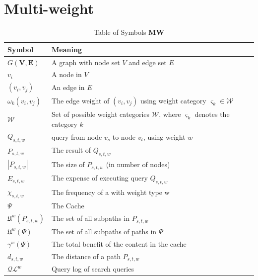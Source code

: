 \section{Multi-weight} \label{sec:intro}


\begin{table}
\begin{tabular*}{\columnwidth}{|l|p{}|}
\hline
\bf Symbol		& \bf Meaning \\\hline
$G\mathbf{(V,E)}$ 	& A graph with node set $V$ and edge set $E$ \\\hline 
$v_i$			& A node in $V$ \\\hline 
$(v_i,v_j)$		& An edge in $E$ \\\hline 
$\omega_k(v_i,v_j)$	& The edge weight of $(v_i,v_j)$ using weight category $\varsigma_k \in \mathcal{W}$ \\\hline
$\mathcal{W}$		& Set of possible weight categories $\mathcal{W}$, where $\varsigma_k$ denotes the category $k$ \\\hline

$Q_{s,t,w}$		& \spath query from node $v_s$ to node $v_t$, using weight $w$\\\hline
$P_{s,t,w}$		& The \spath result of $Q_{s,t,w}$ \\\hline
$|P_{s,t,w}|$		& The size of $P_{s,t,w}$ (in number of nodes) \\\hline
$E_{s,t,w}$		& The expense of executing query $Q_{s,t,w}$ \\\hline
$\chi_{s,t,w}$		& The frequency of a \spath with weight type w \\\hline
$\Psi$ 			& The Cache \\\hline
$\mathfrak{U}^w(P_{s,t,w})$& The set of all subpaths in $P_{s,t,w}$ \\\hline
$\mathfrak{U}^w(\Psi)$	& The set of all subpaths of paths in $\Psi$ \\\hline
$\gamma^w(\Psi)$		& The total benefit of the content in the cache \\\hline

$d_{s,t,w}$		& The \spath distance of a path $P_{s,t,w}$ \\\hline
$\mathcal{QL}^w$		& Query log of search queries \\\hline
\end{tabular*}
\caption{Table of Symbols \textbf{MW}}
\label{tab:symbols}
\end{table}

% 
% 
% 
% 
% 
% 
% 
% 
% 
% 


